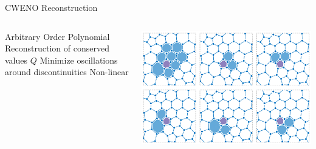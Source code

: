 \begin{frame}{CWENO Reconstruction}
  \begin{columns}
  \begin{outline}
    \1 Arbitrary Order Polynomial Reconstruction of conserved values $Q$
    \1 Minimize oscillations around discontinuities
    \1 Non-linear
  \end{outline}

  \begin{center}
    \includegraphics[width=0.9\linewidth]{cweno.png}
  \end{center}
  
  \end{columns}
\end{frame}
